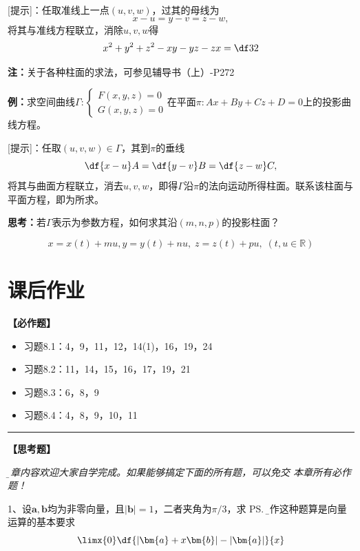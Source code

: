[提示]：任取准线上一点$(u,v,w)$，过其的母线为
$$x-u=y-v=z-w,$$
将其与准线方程联立，消除$u,v,w$得
$$x^2+y^2+z^2-xy-yz-zx=\df32$$

{\bf 注：}关于各种柱面的求法，可参见辅导书（上）-P272

{\bf 例：}求空间曲线$\Gamma:\left\{\begin{array}{l}
F(x,y,z)=0\\ G(x,y,z)=0
\end{array}\right.$在平面$\pi:Ax+By+Cz+D=0$上的投影曲线方程。

[提示]：任取$(u,v,w)\in\Gamma$，其到$\pi$的垂线
$$\df{x-u}A=\df{y-v}B=\df{z-w}C,$$
将其与曲面方程联立，消去$u,v,w$，即得$\Gamma$沿$\pi$的法向运动所得柱面。联系该柱面与
平面方程，即为所求。

{\bf 思考：}若$\Gamma$表示为参数方程，如何求其沿$(m,n,p)$的投影柱面？

$$x=x(t)+mu,y=y(t)+nu,\;z=z(t)+pu,\;(t,u\in\mathbb{R})$$

\newpage

\section*{课后作业}

{\bf 【必作题】}

\begin{itemize}
  \setlength{\itemindent}{1cm}
  \item 习题8.1：4，9，11，12，14(1)，16，19，24
  \item 习题8.2：11，14，15，16，17，19，21
  \item 习题8.3：6，8，9
  \item 习题8.4：4，8，9，10，11
\end{itemize}

\bigskip

\hrule

\bigskip

{\bf 【思考题】}

{\it\b 本章内容欢迎大家自学完成。如果能够搞定下面的所有题，可以免交
本章所有必作题！}


1、设$\bm{a},\bm{b}$均为非零向量，且$|\bm{b}|=1$，二者夹角为$\pi/3$，求
\ps{\b 会作这种题算是向量运算的基本要求}
$$\limx{0}\df{|\bm{a}+x\bm{b}|-|\bm{a}|}{x}$$

